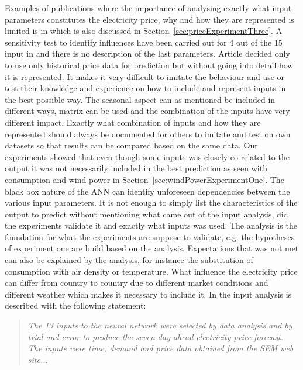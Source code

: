 Examples of publications where the importance of analysing exactly what input parameters constitutes the electricity price, why and how they are represented is limited is in\cite{szkuta1999electricity,sansom1999neural,1} which is also discussed in Section~\ref{sec:priceExperimentThree}. A sensitivity test to identify influences have been carried out for 4 out of the 15 input in \cite{szkuta1999electricity} and there is no description of the last parameters. Article \cite{1} decided only to use only historical price data for prediction but without going into detail how it is represented. It makes it very difficult to imitate the behaviour and use or test their knowledge and experience on how to include and represent inputs in the best possible way. The seasonal aspect can as mentioned be included in different ways, matrix can be used and the combination of the inputs have very different impact. Exactly what combination of inputs and how they are represented should always be documented for others to imitate and test on own datasets so that results can be compared based on the same data. Our experiments showed that even though some inputs was closely co-related to the output it was not necessarily included in the best prediction as seen with consumption and wind power in Section~\ref{sec:windPowerExperimentOne}. The black box nature of the ANN can identify unforeseen dependencies between the various input parameters. It is not enough to simply list the characteristics of the output to predict without mentioning what came out of the input analysis, did the experiments validate it and exactly what inputs was used. The analysis is the foundation for what the experiments are suppose to validate, e.g. the hypotheses of experiment one are build based on the analysis. Expectations that was not met can also be explained by the analysis, for instance the substitution of consumption with air density or temperature. What influence the electricity price can differ from country to country due to different market conditions and different weather which makes it necessary to include it. In \cite{sansom1999neural} the input analysis is described with the following statement:

\begin{quotation}
\textit{The 13 inputs to the neural network were selected by data analysis and by trial and error to produce the seven-day ahead electricity price forecast. The inputs were time, demand and price data obtained from the SEM web site...}
\end{quotation}

